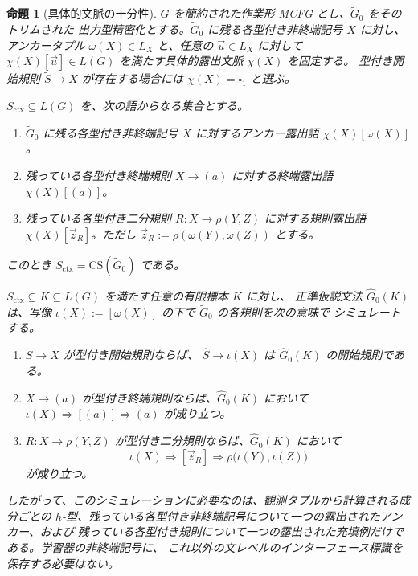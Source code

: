 \documentclass[11pt,a4paper]{ltjsarticle}
\newtheorem{proposition}[theorem]{命題}
\theoremstyle{remark}
\newcommand{\CS}{\mathrm{CS}}
\newcommand{\tuple}[1]{\vec{#1}}
\newcommand{\blank}{\square}
\begin{document}
\begin{proposition}[具体的文脈の十分性]
\label{prop:concrete-context-sufficiency}
\(G\) を簡約された作業形 MCFG とし、\(\widetilde G_0\) をそのトリムされた
出力型精密化とする。\(\widetilde G_0\) に残る各型付き非終端記号 \(X\) に対し、
アンカータプル \(\omega(X)\in L_X\) と、任意の \(\tuple u\in L_X\) に対して
\(\chi(X)[\tuple u]\in L(G)\) を満たす具体的露出文脈 \(\chi(X)\) を固定する。
型付き開始規則 \(\widetilde S\to X\) が存在する場合には
\(\chi(X)=\blank_1\) と選ぶ。

\(S_{\mathrm{ctx}}\subseteq L(G)\) を、次の語からなる集合とする。
\begin{enumerate}[label=(\roman*),leftmargin=*]
\item \(\widetilde G_0\) に残る各型付き非終端記号 \(X\) に対するアンカー露出語
      \(\chi(X)[\omega(X)]\)。
\item 残っている各型付き終端規則 \(X\to(a)\) に対する終端露出語
      \(\chi(X)[(a)]\)。
\item 残っている各型付き二分規則 \(R\colon X\to\rho(Y,Z)\) に対する規則露出語
      \(\chi(X)[\tuple z_R]\)。ただし
      \(\tuple z_R:=\rho(\omega(Y),\omega(Z))\) とする。
\end{enumerate}
このとき \(S_{\mathrm{ctx}}=\CS(\widetilde G_0)\) である。

\(S_{\mathrm{ctx}}\subseteq K\subseteq L(G)\) を満たす任意の有限標本 \(K\) に対し、
正準仮説文法 \(\widehat G_0(K)\) は、写像
\(\iota(X):=[\omega(X)]\) の下で \(\widetilde G_0\) の各規則を次の意味で
シミュレートする。
\begin{enumerate}[label=(\roman*),leftmargin=*]
\item \(\widetilde S\to X\) が型付き開始規則ならば、
      \(\widehat S\to\iota(X)\) は \(\widehat G_0(K)\) の開始規則である。
\item \(X\to(a)\) が型付き終端規則ならば、\(\widehat G_0(K)\) において
      \(\iota(X)\Rightarrow[(a)]\Rightarrow(a)\) が成り立つ。
\item \(R\colon X\to\rho(Y,Z)\) が型付き二分規則ならば、\(\widehat G_0(K)\) において
      \[
        \iota(X)\Rightarrow[\tuple z_R]\Rightarrow
        \rho\bigl(\iota(Y),\iota(Z)\bigr)
      \]
      が成り立つ。
\end{enumerate}

したがって、このシミュレーションに必要なのは、観測タプルから計算される成分ごとの
\(h\)-型、残っている各型付き非終端記号について一つの露出されたアンカー、および
残っている各型付き規則について一つの露出された充填例だけである。学習器の非終端記号に、
これ以外の文レベルのインターフェース標識を保存する必要はない。
\end{proposition}
\end{document}
